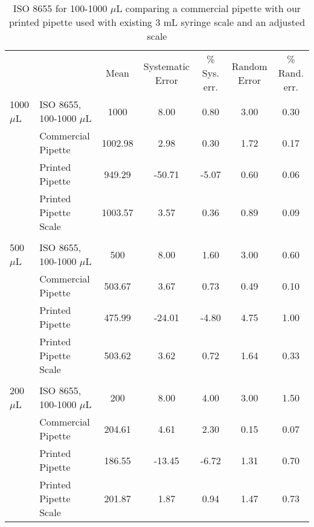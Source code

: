 \documentclass{nature}
\begin{document}
\begin{table}
\begin{adjustwidth}{-0.75in}{0in} %
\centering
\caption{ISO 8655 for 100-1000 $\mu$L comparing a commercial pipette with our printed pipette used with existing 3 mL syringe scale and an adjusted scale}
\label{table3}
\begin{tabular}{llccccc}
&                       & Mean   & Systematic Error & \% Sys. err. & Random Error & \% Rand. err. \\
1000 $\mu$L & ISO 8655, 100-1000 $\mu$L & 1000    & 8.00             & 0.80         & 3.00         & 0.30          \\
& Commercial Pipette    & 1002.98 & 2.98             & 0.30         & 1.72         & 0.17          \\
& Printed Pipette       & 949.29  & -50.71           & -5.07        & 0.60         & 0.06          \\
& Printed Pipette Scale & 1003.57 & 3.57             & 0.36         & 0.89         & 0.09          \\
&                       &         &                  &              &              &               \\
500 $\mu$L  & ISO 8655, 100-1000 $\mu$L & 500     & 8.00             & 1.60         & 3.00         & 0.60          \\
& Commercial Pipette    & 503.67  & 3.67             & 0.73         & 0.49         & 0.10          \\
& Printed Pipette       & 475.99  & -24.01           & -4.80        & 4.75         & 1.00          \\
& Printed Pipette Scale & 503.62  & 3.62             & 0.72         & 1.64         & 0.33          \\
&                       &         &                  &              &              &               \\
200 $\mu$L  & ISO 8655, 100-1000 $\mu$L & 200     & 8.00             & 4.00         & 3.00         & 1.50          \\
& Commercial Pipette    & 204.61  & 4.61             & 2.30         & 0.15         & 0.07          \\
& Printed Pipette       & 186.55  & -13.45           & -6.72        & 1.31         & 0.70          \\
& Printed Pipette Scale & 201.87  & 1.87             & 0.94         & 1.47         & 0.73          \\

\end{tabular}
\end{adjustwidth}
\end{table}
\end{document}
